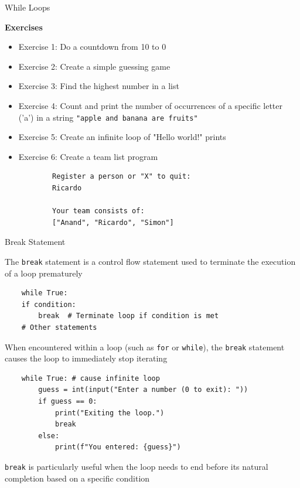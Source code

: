 \documentclass[
	11pt, 
]{beamer}
\begin{document}

\begin{frame}[fragile]{While Loops}

\begin{alertblock}{\textbf{Exercises}}
\begin{itemize}
    \item Exercise 1: Do a countdown from 10 to 0
    \item Exercise 2: Create a simple guessing game
    \item Exercise 3: Find the highest number in a list
    \item Exercise 4: Count and print the number of occurrences of a specific letter ('a') in a string \texttt{"apple and banana are fruits"}
    \item Exercise 5: Create an infinite loop of "Hello world!" prints
    \item Exercise 6: Create a team list program
    \begin{center}
    \begin{verbatim}
        Register a person or "X" to quit: 
        Ricardo
        
        Your team consists of:
        ["Anand", "Ricardo", "Simon"]
    \end{verbatim}
    \end{center}
\end{itemize}    
\end{alertblock}
\end{frame}


\begin{frame}[fragile]{Break Statement}

The \texttt{break} statement is a control flow statement used to terminate the execution of a loop prematurely

\begin{verbatim}
    while True:
    if condition:
        break  # Terminate loop if condition is met
    # Other statements
\end{verbatim}

When encountered within a loop (such as \texttt{for} or \texttt{while}), the \texttt{break} statement causes the loop to immediately stop iterating

\begin{verbatim}
    while True: # cause infinite loop
        guess = int(input("Enter a number (0 to exit): "))
        if guess == 0:
            print("Exiting the loop.")
            break
        else:
            print(f"You entered: {guess}")
\end{verbatim}

\texttt{break} is particularly useful when the loop needs to end before its natural completion based on a specific condition

\end{frame}
\end{document}
